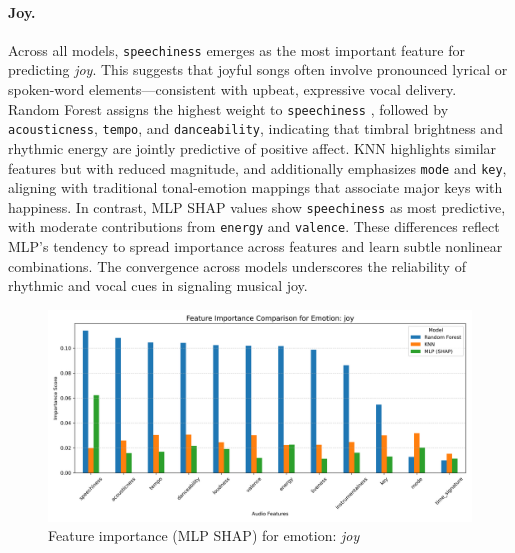 \documentclass{article}
\begin{document}
\paragraph{Joy.} Across all models, \texttt{speechiness} emerges as the most important feature for predicting \textit{joy}. This suggests that joyful songs often involve pronounced lyrical or spoken-word elements—consistent with upbeat, expressive vocal delivery. Random Forest assigns the highest weight to \texttt{speechiness} , followed by \texttt{acousticness}, \texttt{tempo}, and \texttt{danceability}, indicating that timbral brightness and rhythmic energy are jointly predictive of positive affect. KNN highlights similar features but with reduced magnitude, and additionally emphasizes \texttt{mode} and \texttt{key}, aligning with traditional tonal-emotion mappings that associate major keys with happiness. In contrast, MLP SHAP values show \texttt{speechiness} as most predictive, with moderate contributions from \texttt{energy} and \texttt{valence}. These differences reflect MLP's tendency to spread importance across features and learn subtle nonlinear combinations. The convergence across models underscores the reliability of rhythmic and vocal cues in signaling musical joy.

\begin{figure}[H]
\centering
\includegraphics[width=\linewidth]{Graphics/per_label/joy_feature_importance.png}
\caption{Feature importance (MLP SHAP) for emotion: \textit{joy}}
\label{fig:shap_joy}
\end{figure}
\end{document}
